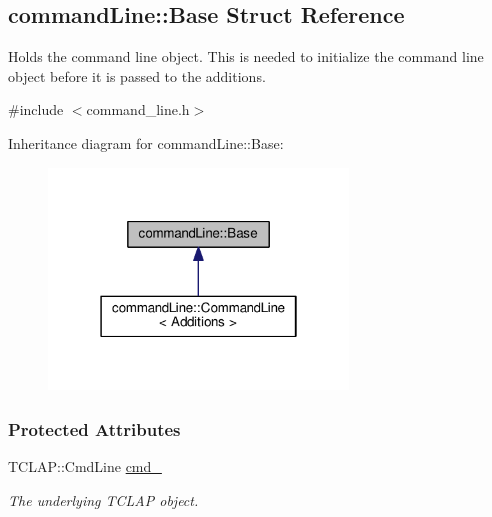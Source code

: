 \hypertarget{structcommandLine_1_1Base}{}\subsection{command\+Line\+:\+:Base Struct Reference}
\label{structcommandLine_1_1Base}


Holds the command line object. This is needed to initialize the command line object before it is passed to the additions.  




{\ttfamily \#include $<$command\+\_\+line.\+h$>$}



Inheritance diagram for command\+Line\+:\+:Base\+:\nopagebreak
\begin{figure}[H]
\begin{center}
\leavevmode
\includegraphics[width=226pt]{structcommandLine_1_1Base__inherit__graph}
\end{center}
\end{figure}
\subsubsection*{Protected Attributes}
\begin{DoxyCompactItemize}
\item 
T\+C\+L\+A\+P\+::\+Cmd\+Line \hyperlink{structcommandLine_1_1Base_a3fccc911e1f751bca48611f16ff79702}{cmd\+\_\+}\hypertarget{structcommandLine_1_1Base_a3fccc911e1f751bca48611f16ff79702}{}\label{structcommandLine_1_1Base_a3fccc911e1f751bca48611f16ff79702}

\begin{DoxyCompactList}\small\item\em The underlying T\+C\+L\+AP object. \end{DoxyCompactList}\end{DoxyCompactItemize}


